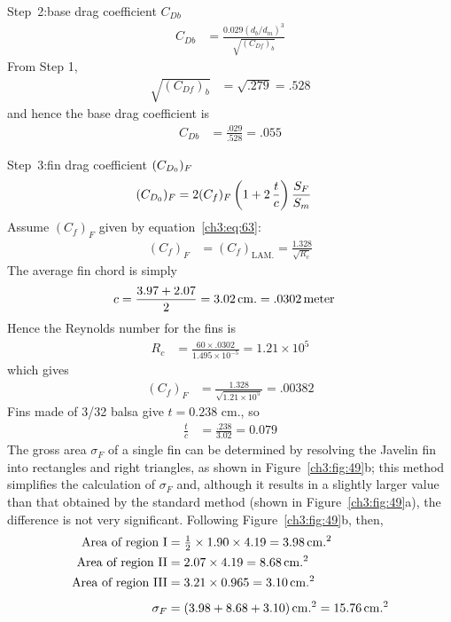 \medskip\noindent Step~2:\quad base drag coefficient $C_{Db}$
\begin{align*}
C_{Db} &= \frac{0.029(d_b/d_m)^3}{\sqrt{(C_{Df})_b}}
\end{align*}
From Step 1,
\begin{align*}
\sqrt{(C_{Df})_b} &= \sqrt{.279} = .528
\end{align*}
and hence the base drag coefficient is
\begin{align*}
C_{Db} &= \frac{.029}{.528} = .055
\end{align*}

\medskip\noindent Step~3:\quad fin drag coefficient $(C_{D_0})_F$
\begin{align*}
(C_{D_0})_F &= 2(C_f)_F\left(1 + 2\,\frac{t}{c}\right)\frac{S_F}{S_m}
\end{align*}
Assume $(C_f)_F$ given by equation~\eqref{ch3:eq:63}:
\begin{align*}
(C_f)_F &= (C_f)_{\mathrm{LAM.}} = \frac{1.328}{\sqrt{R_c}}
\end{align*}
The average fin chord is simply
\begin{align*}
c &= \frac{3.97 + 2.07}{2} = 3.02\,\mathrm{cm.} = .0302\,\mathrm{meter}
\end{align*}
Hence the Reynolds number for the fins is
\begin{align*}
R_c &= \frac{60 \times .0302}{1.495 \times 10^{-5}} = 1.21 \times 10^{5}
\end{align*}
which gives
\begin{align*}
(C_f)_F &= \frac{1.328}{\sqrt{1.21 \times 10^{5}}} = .00382
\end{align*}
Fins made of 3/32\textquotedbl{} balsa give $t = 0.238$ cm., so
\begin{align*}
\frac{t}{c} &= \frac{.238}{3.02} = 0.079
\end{align*}
The gross area $\sigma_F$ of a single fin can be determined by resolving the Javelin fin into
rectangles and right triangles, as shown in Figure~\ref{ch3:fig:49}b; this method simplifies the
calculation of $\sigma_F$ and, although it results in a slightly larger value than that obtained
by the standard method (shown in Figure~\ref{ch3:fig:49}a), the difference is not very
significant. Following Figure~\ref{ch3:fig:49}b, then,
\begin{align*}
\text{Area of region I} &= \tfrac{1}{2} \times 1.90 \times 4.19 = 3.98\,\mathrm{cm.^{2}}\\
\text{Area of region II} &= 2.07 \times 4.19 = 8.68\,\mathrm{cm.^{2}}\\
\text{Area of region III} &= 3.21 \times 0.965 = 3.10\,\mathrm{cm.^{2}}\\[1ex]
\sigma_F &= (3.98 + 8.68 + 3.10)\,\mathrm{cm.^{2}} = 15.76\,\mathrm{cm.^{2}}
\end{align*}
